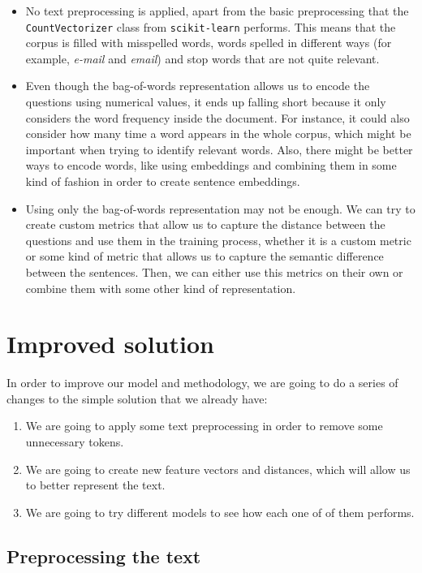 \documentclass[11pt,a4paper]{article}
\begin{document}
\begin{itemize}
  \item No text preprocessing is applied, apart from the basic preprocessing that
  the \texttt{CountVectorizer} class from \texttt{scikit-learn} performs. This means
  that the corpus is filled with misspelled words, words spelled in different ways
  (for example, \emph{e-mail} and \emph{email}) and stop words that are not quite
  relevant.
  \item Even though the bag-of-words representation allows us to encode the questions
  using numerical values, it ends up falling short because it only considers the word
  frequency inside the document. For instance, it could also consider how many time a
  word appears in the whole corpus, which might be important when trying to identify
  relevant words. Also, there might be better ways to encode words, like using embeddings
  and combining them in some kind of fashion in order to create sentence embeddings.
  \item Using only the bag-of-words representation may not be enough. We can try to create
  custom metrics that allow us to capture the distance between the questions and use them
  in the training process, whether it is a custom metric or some kind of metric that allows
  us to capture the semantic difference between the sentences. Then, we can either use this
  metrics on their own or combine them with some other kind of representation.
\end{itemize}

\section{Improved solution}

In order to improve our model and methodology, we are going to do a series of changes
to the simple solution that we already have:

\begin{enumerate}
  \item We are going to apply some text preprocessing in order to remove some
  unnecessary tokens.
  \item We are going to create new feature vectors and distances, which
  will allow us to better represent the text.
  \item We are going to try different models to see how each one of of them performs.
\end{enumerate}

\subsection{Preprocessing the text}
\end{document}
